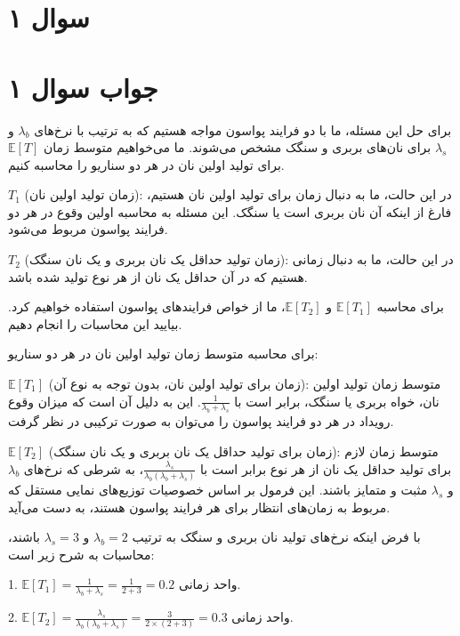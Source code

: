 \section*{سوال ۱}



\section*{جواب سوال ۱}

برای حل این مسئله، ما با دو فرایند پواسون مواجه هستیم که به ترتیب با نرخ‌های \( \lambda_b \) و \( \lambda_s \) برای نان‌های بربری و سنگک مشخص می‌شوند. ما می‌خواهیم متوسط زمان \( \mathbb{E}[T] \) برای تولید اولین نان در هر دو سناریو را محاسبه کنیم.

\( T_1 \) (زمان تولید اولین نان): در این حالت، ما به دنبال زمان برای تولید اولین نان هستیم، فارغ از اینکه آن نان بربری است یا سنگک. این مسئله به محاسبه اولین وقوع در هر دو فرایند پواسون مربوط می‌شود.

\( T_2 \) (زمان تولید حداقل یک نان بربری و یک نان سنگک): در این حالت، ما به دنبال زمانی هستیم که در آن حداقل یک نان از هر نوع تولید شده باشد.

برای محاسبه \( \mathbb{E}[T_1] \) و \( \mathbb{E}[T_2] \)، ما از خواص فرایندهای پواسون استفاده خواهیم کرد. بیایید این محاسبات را انجام دهیم.

برای محاسبه متوسط زمان تولید اولین نان در هر دو سناریو:

\( \mathbb{E}[T_1] \) (زمان برای تولید اولین نان، بدون توجه به نوع آن): متوسط زمان تولید اولین نان، خواه بربری یا سنگک، برابر است با \( \frac{1}{\lambda_b + \lambda_s} \). این به دلیل آن است که میزان وقوع رویداد در هر دو فرایند پواسون را می‌توان به صورت ترکیبی در نظر گرفت.

\( \mathbb{E}[T_2] \) (زمان برای تولید حداقل یک نان بربری و یک نان سنگک): متوسط زمان لازم برای تولید حداقل یک نان از هر نوع برابر است با \( \frac{\lambda_s}{\lambda_b(\lambda_b + \lambda_s)} \)، به شرطی که نرخ‌های \( \lambda_b \) و \( \lambda_s \) مثبت و متمایز باشند. این فرمول بر اساس خصوصیات توزیع‌های نمایی مستقل که مربوط به زمان‌های انتظار برای هر فرایند پواسون هستند، به دست می‌آید.

با فرض اینکه نرخ‌های تولید نان بربری و سنگک به ترتیب \( \lambda_b = 2 \) و \( \lambda_s = 3 \) باشند، محاسبات به شرح زیر است:

1. \( \mathbb{E}[T_1] = \frac{1}{\lambda_b + \lambda_s} = \frac{1}{2 + 3} = 0.2 \) واحد زمانی.

2. \( \mathbb{E}[T_2] = \frac{\lambda_s}{\lambda_b(\lambda_b + \lambda_s)} = \frac{3}{2 \times (2 + 3)} = 0.3 \) واحد زمانی.
